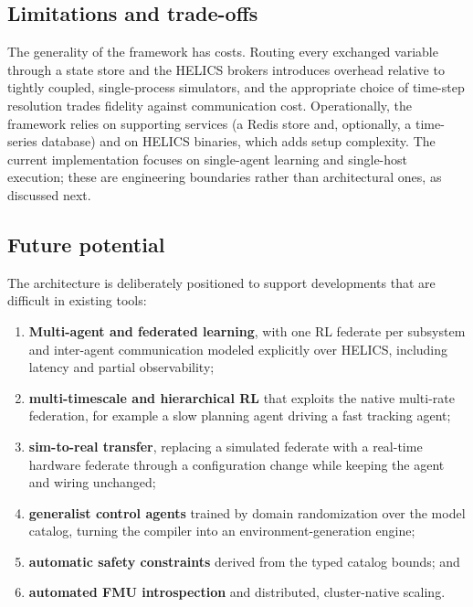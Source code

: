\documentclass[preprint,12pt]{elsarticle}
\begin{document}
\subsection{Limitations and trade-offs}
The generality of the framework has costs. Routing every exchanged variable through
a state store and the HELICS brokers introduces overhead relative to tightly
coupled, single-process simulators, and the appropriate choice of time-step
resolution trades fidelity against communication cost.
Operationally, the framework relies on supporting services (a Redis store and,
optionally, a time-series database) and on HELICS binaries, which adds setup
complexity. The current implementation focuses on single-agent learning and
single-host execution; these are engineering boundaries rather than architectural
ones, as discussed next.

\subsection{Future potential}
The architecture is deliberately positioned to support developments that are
difficult in existing tools:
\begin{enumerate}
  \item \textbf{Multi-agent and federated learning}, with one RL federate per
        subsystem and inter-agent communication modeled explicitly over HELICS,
        including latency and partial observability;
  \item \textbf{multi-timescale and hierarchical RL} that exploits the native
        multi-rate federation, for example a slow planning agent driving a fast
        tracking agent;
  \item \textbf{sim-to-real transfer}, replacing a simulated federate with a
        real-time hardware federate through a configuration change while keeping
        the agent and wiring unchanged;
  \item \textbf{generalist control agents} trained by domain randomization over the
        model catalog, turning the compiler into an environment-generation engine;
  \item \textbf{automatic safety constraints} derived from the typed catalog bounds;
        and
  \item \textbf{automated FMU introspection} and distributed, cluster-native
        scaling.
\end{enumerate}

\end{document}
